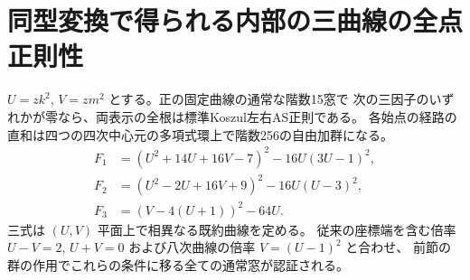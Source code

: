 \section{同型変換で得られる内部の三曲線の全点正則性}
\label{sec:rank-fifteen-regular-orbits}
\begin{theorem}\label{thm:rank-fifteen-regular-orbits}
$U=zk^2$, $V=zm^2$ とする。正の固定曲線の通常な階数15窓で
次の三因子のいずれかが零なら、両表示の全根は標準Koszul左右AS正則である。
各始点の経路の直和は四つの四次中心元の多項式環上で階数256の自由加群になる。
\[
\begin{aligned}
 F_1&=(U^2+14U+16V-7)^2-16U(3U-1)^2,\\
 F_2&=(U^2-2U+16V+9)^2-16U(U-3)^2,\\
 F_3&=(V-4(U+1))^2-64U .
\end{aligned}
\]
三式は $(U,V)$ 平面上で相異なる既約曲線を定める。
従来の座標端を含む倍率 $U-V=2$, $U+V=0$ および八次曲線の倍率 $V=(U-1)^2$ と合わせ、
前節の群の作用でこれらの条件に移る全ての通常窓が認証される。
\end{theorem}
